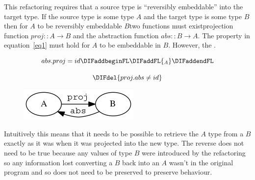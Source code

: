 This refactoring requires that a source type is ``reversibly embeddable'' into the target type. If the source type is some type $A$ and the target type is some type $B$ then for $A$ to be reversibly embeddable \DIFdelbegin {}\DIFdelend \DIFaddbegin {}\DIFaddend $B$\DIFaddbegin \DIFadd{, }\DIFaddend two functions must exist\DIFdelbegin {}\DIFdelend \DIFaddbegin {}\DIFaddend projection function $proj :: A \rightarrow B$ and the abstraction function $abs :: B \rightarrow A$\DIFaddbegin {}\DIFaddend . The property in equation~\ref{eq1} must hold for $A$ to be embeddable in $B$. However, the \DIFdelbegin {}\DIFdelend \DIFaddbegin {}\DIFaddend .   

\begin{figure}[t]
\begin{equation}\label{eq1}
abs . proj = id\DIFaddbeginFL \DIFaddFL{_A
}\DIFaddendFL \end{equation}
\DIFaddbeginFL \end{figure}
\DIFaddend 

\DIFdelbegin \begin{displaymath}\DIFdel{%
proj . abs \neq id
}\end{displaymath}
\DIFdelend \DIFaddbegin \begin{figure}[h]
	\begin{center}
		\includegraphics[scale=.5]{graphVis/Chapter3/galoisConn.png}
	\end{center}
	\caption{}
	\label{galois}
\DIFaddendFL \end{figure}

Intuitively this means that it needs to be possible to retrieve the $A$ type from a $B$ exactly as it was when it was projected into the new type. The reverse does not need to be true because any values of type $B$ were introduced by the refactoring so any information lost converting a $B$ back into an $A$ wasn't in the original program and so does not need to be preserved to preserve behaviour.

